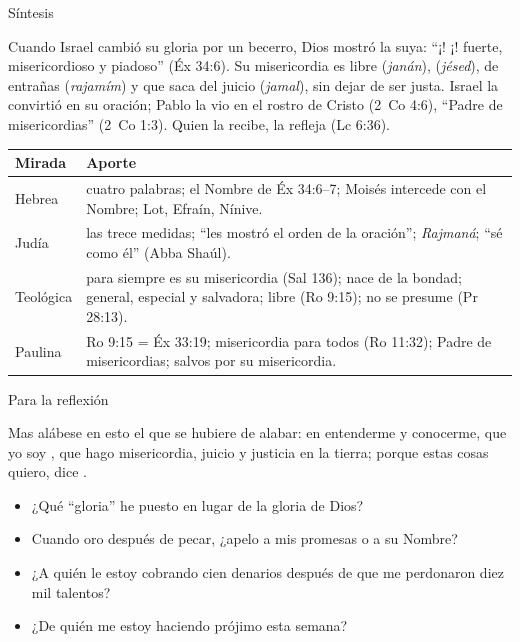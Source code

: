 \begin{frame}{Síntesis}
\begin{tcolorbox}[colback=papiro,colframe=azul,boxrule=1pt,arc=3pt]
\small Cuando Israel cambió su gloria por un becerro, Dios mostró la suya: ``¡\SENOR! ¡\SENOR! fuerte, misericordioso y piadoso'' (Éx 34:6). Su misericordia es  libre (\emph{janán}),  (\emph{jésed}),  de entrañas (\emph{rajamím}) y  que saca del juicio (\emph{jamal}), sin dejar de ser justa. Israel la convirtió en su oración; Pablo la vio en el rostro de Cristo (2~Co 4:6), ``Padre de misericordias'' (2~Co 1:3). Quien la recibe, la refleja (Lc 6:36).
\end{tcolorbox}
\scriptsize\renewcommand{\arraystretch}{1.15}
\begin{tabular}{@{}>{\RaggedRight\arraybackslash}p{2.4cm}>{\RaggedRight\arraybackslash}p{9.4cm}@{}}
\toprule
\textbf{Mirada} & \textbf{Aporte} \\ \midrule
Hebrea & cuatro palabras; el Nombre de Éx 34:6--7; Moisés intercede con el Nombre; Lot, Efraín, Nínive. \\
Judía & las trece medidas; ``les mostró el orden de la oración''; \emph{Rajmaná}; ``sé como él'' (Abba Shaúl). \\
Teológica & para siempre es su misericordia (Sal 136); nace de la bondad; general, especial y salvadora; libre (Ro 9:15); no se presume (Pr 28:13). \\
Paulina & Ro 9:15 = Éx 33:19; misericordia para todos (Ro 11:32); Padre de misericordias; salvos por su misericordia. \\
\bottomrule
\end{tabular}
\end{frame}

\begin{frame}{Para la reflexión}
\begin{cita}Mas alábese en esto el que se hubiere de alabar: en entenderme y conocerme, que yo soy \SENOR, que hago misericordia, juicio y justicia en la tierra; porque estas cosas quiero, dice \SENOR.\end{cita}
\begin{center}\end{center}
\small
\begin{itemize}
\item ¿Qué ``gloria'' he puesto en lugar de la gloria de Dios?
\item Cuando oro después de pecar, ¿apelo a mis promesas o a su Nombre?
\item ¿A quién le estoy cobrando cien denarios después de que me perdonaron diez mil talentos?
\item ¿De quién me estoy haciendo prójimo esta semana?
\end{itemize}
\end{frame}

